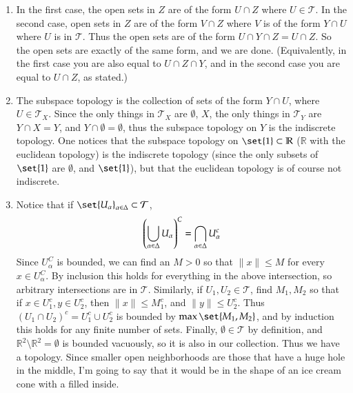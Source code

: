 \documentclass[12pt]{article}
\theoremstyle{definitionstyle}
\def\mbb#1{\mathbb{#1}}
\def \R{\mbb{R}}
\newcommand{\mg}[1]{\| #1 \|}
\begin{document}
\begin{enumerate}[leftmargin=\labelsep]
		\item In the first case, the open sets in $Z$ are of the form $U \cap Z$ where $U \in \mathcal{T}$. In the second case, open sets in $Z$ are of the form $V \cap Z$ where $V$ is of the form $Y \cap U$ where $U$ is in $\mathcal{T}$. Thus the open sets are of the form $U \cap Y \cap Z = U \cap Z$. So the open sets are exactly of the same form, and we are done. (Equivalently, in the first case you are also equal to $U \cap Z \cap Y$, and in the second case you are equal to $U \cap Z$, as stated.)
		
		\item The subspace topology is the collection of sets of the form $Y \cap U$, where $U \in \mathcal{T}_X$. Since the only things in $\mathcal{T}_X$ are $\emptyset$, $X$, the only things in $\mathcal{T}_Y$ are $Y \cap X = Y$, and $Y \cap \emptyset = \emptyset$, thus the subspace topology on $Y$ is the indiscrete topology. One notices that the subspace topology on $\set{1} \subset \R$ ($\R$ with the euclidean topology) is the indiscrete topology (since the only subsets of $\set{1}$ are $\emptyset$, and $\set{1}$), but that the euclidean topology is of course not indiscrete.
	
		\item Notice that if $\set{U_\alpha}_{\alpha \in \Delta} \subset \mathcal{T}$, 
		\begin{align*}
			\qty(\bigcup_{\alpha \in \Delta} U_\alpha)^C = \bigcap_{\alpha \in \Delta} U_\alpha^c
		\end{align*}
		Since $U_\alpha^C$ is bounded, we can find an $M > 0$ so that $\mg{x} \leq M$ for every $x \in U_\alpha^C$. By inclusion this holds for everything in the above intersection, so arbitrary intersections are in $\mathcal{T}$. Similarly, if $U_1, U_2 \in \mathcal{T}$, find $M_1, M_2$ so that if $x \in U_1^c, y \in U_2^c$, then $\mg{x} \leq M_1^c$, and $\mg{y} \leq U_2^c$. Thus $(U_1 \cap U_2)^c = U_1^c \cup U_2^c$ is bounded by $\max\set{M_1, M_2}$, and by induction this holds for any finite number of sets. Finally, $\emptyset \in \mathcal{T}$ by definition, and $\R^2 \setminus \R^2 = \emptyset$ is bounded vacuously, so it is also in our collection. Thus we have a topology. Since smaller open neighborhoods are those that have a huge hole in the middle, I'm going to say that it would be in the shape of an ice cream cone with a filled inside.
	\end{enumerate}
\end{document}
